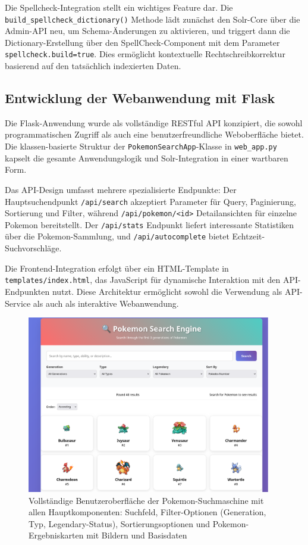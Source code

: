 Die Spellcheck-Integration stellt ein wichtiges Feature dar. Die \texttt{build\_spellcheck\_dictionary()} Methode lädt zunächst den Solr-Core über die Admin-API neu, um Schema-Änderungen zu aktivieren, und triggert dann die Dictionary-Erstellung über den SpellCheck-Component mit dem Parameter \texttt{spellcheck.build=true}. Dies ermöglicht kontextuelle Rechtschreibkorrektur basierend auf den tatsächlich indexierten Daten.

\subsection{Entwicklung der Webanwendung mit Flask}

Die Flask-Anwendung wurde als vollständige RESTful API konzipiert, die sowohl programmatischen Zugriff als auch eine benutzerfreundliche Weboberfläche bietet. Die klassen-basierte Struktur der \texttt{PokemonSearchApp}-Klasse in \texttt{web\_app.py} kapselt die gesamte Anwendungslogik und Solr-Integration in einer wartbaren Form.

Das API-Design umfasst mehrere spezialisierte Endpunkte: Der Hauptsuchendpunkt \texttt{/api/search} akzeptiert Parameter für Query, Paginierung, Sortierung und Filter, während \texttt{/api/pokemon/<id>} Detailansichten für einzelne Pokemon bereitstellt. Der \texttt{/api/stats} Endpunkt liefert interessante Statistiken über die Pokemon-Sammlung, und \texttt{/api/autocomplete} bietet Echtzeit-Suchvorschläge.

Die Frontend-Integration erfolgt über ein HTML-Template in \texttt{templates/index.html}, das JavaScript für dynamische Interaktion mit den API-Endpunkten nutzt. Diese Architektur ermöglicht sowohl die Verwendung als API-Service als auch als interaktive Webanwendung.

\begin{figure}[htbp]
    \centering
    \includegraphics[width=0.95\textwidth]{figures/Screenshot_whole_page.png}
    \caption{Vollständige Benutzeroberfläche der Pokemon-Suchmaschine mit allen Hauptkomponenten: Suchfeld, Filter-Optionen (Generation, Typ, Legendary-Status), Sortierungsoptionen und Pokemon-Ergebniskarten mit Bildern und Basisdaten}
    \label{fig:whole_page}
\end{figure}

